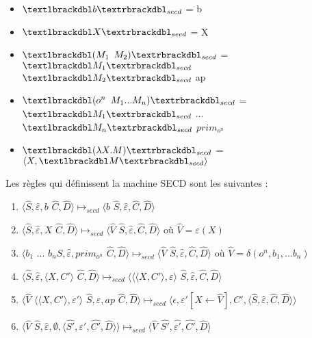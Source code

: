 \documentclass[10pt,a4paper]{article}
\begin{document}
				\begin{itemize}
					\item[] $\textlbrackdbl b\textrbrackdbl _{secd}$ = b
					\item[] $\textlbrackdbl X\textrbrackdbl _{secd}$ = X
					\item[] $\textlbrackdbl (M_{1}$ $M_{2})\textrbrackdbl _{secd}$ = $\textlbrackdbl M_{1}\textrbrackdbl _{secd}$ $\textlbrackdbl M_{2}\textrbrackdbl _{secd}$ ap
					\item[] $\textlbrackdbl (o^{n}$ $M_{1}...M_{n})\textrbrackdbl _{secd}$ = $\textlbrackdbl M_{1}\textrbrackdbl _{secd}$ $...$ $\textlbrackdbl M_{n}\textrbrackdbl _{secd}$ $prim_{o^{n}}$
					\item[]  $\textlbrackdbl(\lambda X.M)\textrbrackdbl _{secd}$ =  $\langle X,\textlbrackdbl M\textrbrackdbl _{secd}\rangle$
				\end{itemize}
				\bigbreak
				
			
				Les règles qui définissent la machine SECD sont les suivantes :
				\begin{enumerate}
					\item $\langle\widehat{S},\widehat{\varepsilon},b$ $\widehat{C},\widehat{D}\rangle \longmapsto_{secd} \langle b$ $\widehat{S},\widehat{\varepsilon},\widehat{C},\widehat{D}\rangle$
					\item $\langle\widehat{S},\widehat{\varepsilon},X$ $\widehat{C},\widehat{D}\rangle \longmapsto_{secd} \langle \widehat{V}$ $\widehat{S},\widehat{\varepsilon},\widehat{C},\widehat{D}\rangle$ où $\widehat{V} = \varepsilon(X)$
					\item $\langle b_{1}$ $...$ $b_{n}\widehat{S},\widehat{\varepsilon},prim_{o^{n}}$ $\widehat{C},\widehat{D}\rangle \longmapsto_{secd} \langle \widehat{V}$ $\widehat{S},\widehat{\varepsilon},\widehat{C},\widehat{D}\rangle$ où $\widehat{V} = \delta(o^{n},b_1,...b_{n})$
					\item $\langle\widehat{S},\widehat{\varepsilon},\langle X,C'\rangle$ $\widehat{C},\widehat{D}\rangle \longmapsto_{secd} \langle\langle\langle X,C'\rangle,\varepsilon\rangle$ $\widehat{S},\widehat{\varepsilon},\widehat{C},\widehat{D}\rangle$
					\item $\langle\widehat{V}$ $\langle\langle X,C'\rangle,\varepsilon'\rangle$ $\widehat{S},\widehat{\varepsilon},ap$ $\widehat{C},\widehat{D}\rangle \longmapsto_{secd} \langle\epsilon,\varepsilon'[X \leftarrow \widehat{V}],C',\langle\widehat{S},\widehat{\varepsilon},\widehat{C},\widehat{D}\rangle\rangle$
					\item $\langle\widehat{V}$ $\widehat{S},\widehat{\varepsilon},\emptyset,\langle\widehat{S'},\widehat{\varepsilon'},\widehat{C'},\widehat{D}\rangle\rangle \longmapsto_{secd} \langle \widehat{V}$ $\widehat{S'},\widehat{\varepsilon'},\widehat{C'},\widehat{D}\rangle$
				\end{enumerate}
				\bigbreak
				
\end{document}
